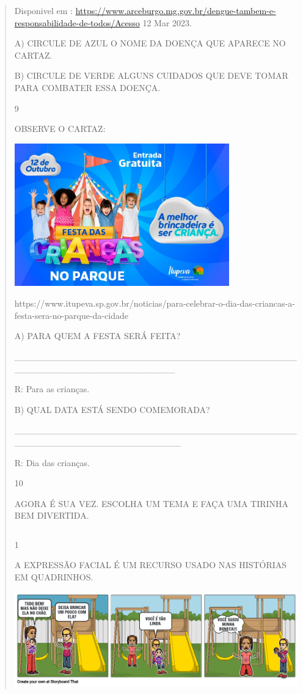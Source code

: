 {{{{\begin{verse}
{{\begin{escolha}
{{{{{Disponivel em :
\url{https://www.arceburgo.mg.gov.br/dengue-tambem-e-responsabilidade-de-todos/Acesso}
12 Mar 2023.

A) CIRCULE DE AZUL O NOME DA DOENÇA QUE APARECE NO CARTAZ.

B) CIRCULE DE VERDE ALGUNS CUIDADOS QUE DEVE TOMAR PARA COMBATER ESSA
DOENÇA.

\num{9}

OBSERVE O CARTAZ:

\includegraphics[width=3.66026in,height=2.43572in]{media/image135.jpeg}

https://www.itupeva.sp.gov.br/noticias/para-celebrar-o-dia-das-criancas-a-festa-sera-no-parque-da-cidade

A) PARA QUEM A FESTA SERÁ FEITA?

\_\_\_\_\_\_\_\_\_\_\_\_\_\_\_\_\_\_\_\_\_\_\_\_\_\_\_\_\_\_\_\_\_\_\_\_\_\_\_\_\_\_\_\_\_\_\_\_\_\_\_\_\_\_\_\_\_\_\_\_\_\_\_\_\_\_\_\_\_

R: Para as crianças.

B) QUAL DATA ESTÁ SENDO COMEMORADA?

\_\_\_\_\_\_\_\_\_\_\_\_\_\_\_\_\_\_\_\_\_\_\_\_\_\_\_\_\_\_\_\_\_\_\_\_\_\_\_\_\_\_\_\_\_\_\_\_\_\_\_\_\_\_\_\_\_\_\_\_\_\_\_\_\_\_\_\_\_\_

R: Dia das crianças.

\num{10}

AGORA É SUA VEZ. ESCOLHA UM TEMA E FAÇA UMA TIRINHA BEM DIVERTIDA.

\begin{longtable}[]{@{}ll@{}}
\toprule
&\tabularnewline
\bottomrule
\end{longtable}


\num{1}

A EXPRESSÃO FACIAL É UM RECURSO USADO NAS HISTÓRIAS EM QUADRINHOS.

\includegraphics[width=4.88436in,height=1.61667in]{media/image136.png}

}}}}}
\end{escolha}}}
\end{verse}}}}}
